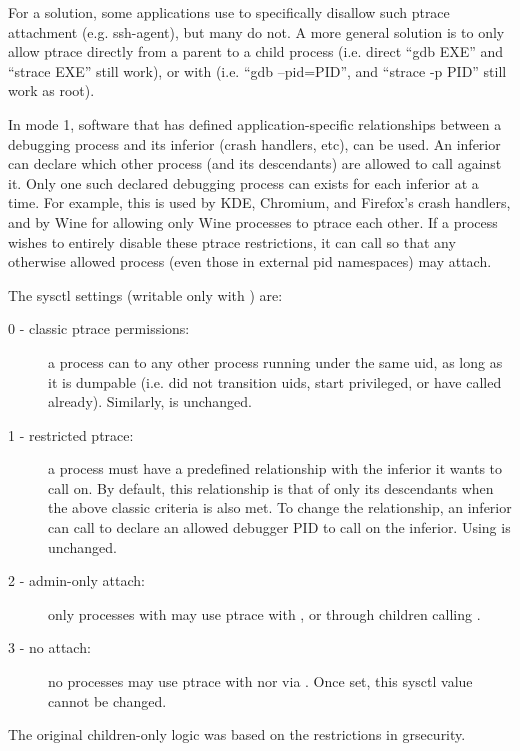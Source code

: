 \documentclass[a4paper,8pt,english]{sphinxmanual}
\begin{document}
For a solution, some applications use  to
specifically disallow such ptrace attachment (e.g. ssh-agent), but many
do not. A more general solution is to only allow ptrace directly from a
parent to a child process (i.e. direct ``gdb EXE'' and ``strace EXE'' still
work), or with  (i.e. ``gdb --pid=PID'', and ``strace -p PID''
still work as root).

In mode 1, software that has defined application-specific relationships
between a debugging process and its inferior (crash handlers, etc),
 can be used. An inferior can declare which
other process (and its descendants) are allowed to call 
against it. Only one such declared debugging process can exists for
each inferior at a time. For example, this is used by KDE, Chromium, and
Firefox's crash handlers, and by Wine for allowing only Wine processes
to ptrace each other. If a process wishes to entirely disable these ptrace
restrictions, it can call 
so that any otherwise allowed process (even those in external pid namespaces)
may attach.

The sysctl settings (writable only with ) are:
\begin{description}
\item[{0 - classic ptrace permissions:}] \leavevmode
a process can  to any other
process running under the same uid, as long as it is dumpable (i.e.
did not transition uids, start privileged, or have called
 already). Similarly,  is
unchanged.

\item[{1 - restricted ptrace:}] \leavevmode
a process must have a predefined relationship
with the inferior it wants to call  on. By default,
this relationship is that of only its descendants when the above
classic criteria is also met. To change the relationship, an
inferior can call  to declare
an allowed debugger PID to call  on the inferior.
Using  is unchanged.

\item[{2 - admin-only attach:}] \leavevmode
only processes with  may use ptrace
with , or through children calling .

\item[{3 - no attach:}] \leavevmode
no processes may use ptrace with  nor via
. Once set, this sysctl value cannot be changed.

\end{description}

The original children-only logic was based on the restrictions in grsecurity.



\renewcommand{\indexname}{Index}
\printindex
\end{document}
